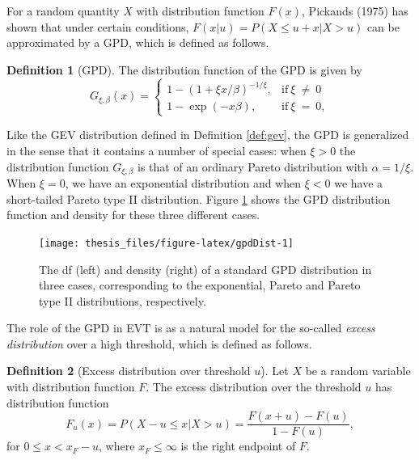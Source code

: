 \documentclass[a4paper,11pt]{article}
\theoremstyle{definition}
\newtheorem{definition}{Definition}[section]
\theoremstyle{definition}
\theoremstyle{definition}
\theoremstyle{definition}
\theoremstyle{remark}
\begin{document}
For a random quantity \(X\) with distribution function \(F(x)\), Pickands (1975) has shown that under certain conditions, \(F(x \vert u) = P(X \leq u +x\vert X>u)\) can be approximated by a GPD, which is defined as follows.
\begin{definition}[GPD]
\protect\hypertarget{def:gpd}{}{\label{def:gpd} {} }
The distribution function of the GPD is given by
\begin{equation}
G_{\xi, \beta}(x) = 
\begin{cases}
1 - (1 + \xi x / \beta)^{-1/\xi}, & \text{if}\ \xi \ \neq\ 0 \\
1 - \exp(-x\beta), & \text{if}\ \xi \ =\ 0, 
\end{cases}
\label{eq:GPD}
\end{equation}
\end{definition}
Like the GEV distribution defined in Definition \ref{def:gev}, the GPD is generalized in the sense that it contains a number of special cases: when \(\xi > 0\) the distribution function \(G_{\xi, \beta}\) is that of an ordinary Pareto distribution with \(\alpha = 1/\xi\). When \(\xi = 0\), we have an exponential distribution and when \(\xi < 0\) we have a short-tailed Pareto type II distribution. Figure \ref{fig:gpdDist} shows the GPD distribution function and density for these three different cases.
\begin{figure}[H]

{\centering \texttt{[image: thesis\_files/figure-latex/gpdDist-1]} 

}

\caption{The df (left) and density (right) of a standard GPD distribution in three cases, corresponding to the exponential, Pareto and Pareto type II distributions, respectively.}\label{fig:gpdDist}
\end{figure}
The role of the GPD in EVT is as a natural model for the so-called \emph{excess distribution} over a high threshold, which is defined as follows.
\begin{definition}[Excess distribution over threshold $u$]
\protect\hypertarget{def:excessdist}{}{\label{def:excessdist} {} }
Let \(X\) be a random variable with distribution function \(F\). The excess distribution over the threshold \(u\) has distribution function
\begin{equation}
F_{u}(x) = P(X - u \leq x \vert X > u) = \frac{F(x + u) - F(u)}{1 - F(u)},
\label{eq:excessdist}
\end{equation}
for \(0 \leq x < x_F - u\), where \(x_F \leq \infty\) is the right endpoint of \(F\).
\end{definition}
\end{document}
